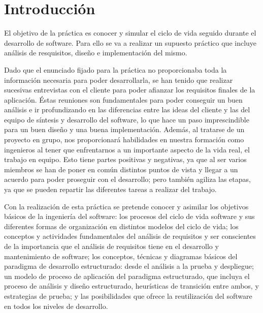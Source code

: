 \documentclass[12pt,a4paper,spanish,twoside]{article}
\begin{document}

\tableofcontents
\newpage
\section{Introducción}
El objetivo de la práctica es conocer y simular el ciclo de vida seguido
durante el desarrollo de software. Para ello se va a realizar un supuesto
práctico que incluye análisis de resquisitos, diseño e implementación del
mismo. 

Dado que el enunciado fijado para la práctica no proporcionaba toda la
información necesaria para poder desarrollarla, se han tenido que realizar
sucesivas entrevistas con el cliente para poder afianzar los requisitos finales
de la aplicación. Éstas reuniones son fundamentales para poder conseguir un
buen análisis e ir profundizando en las diferencias entre las ideas del
cliente y las del equipo de síntesis y desarrollo del software, lo que hace
un paso imprescindible para un buen diseño y una buena
implementación. Además, al tratarse de un proyecto en grupo, nos
proporcionará habilidades en nuestra formación como ingenieros al tener que
enfrentarnos a un importante aspecto de la vida real, el trabajo en
equipo. Esto tiene partes positivas y negativas, ya que al ser varios
miembros se han de poner en común distintos puntos de vista y llegar a un
acuerdo para poder proseguir con el desarrollo; pero también agiliza las
etapas, ya que se pueden repartir las diferentes tareas a realizar del
trabajo. 

Con la realización de esta práctica se pretende conocer y asimilar los
objetivos básicos de la ingeniería del software: los procesos del ciclo de
vida software y sus diferentes formas de organización en distintos modelos
del ciclo de vida; los conceptos y actividades fundamentales del análisis
de requisitos y ser conscientes de la importancia que el análisis de
requisitos tiene en el desarrollo y mantenimiento de software; los conceptos,
técnicas y diagramas básicos del paradigma de desarrollo estructurado: desde
el análisis a la prueba y despliegue; un modelo de proceso de aplicación del
paradigma estructurado, que incluya el proceso de análisis y diseño
estructurado, heurísticas de transición entre ambos, y estrategias de prueba;
y las posibilidades que ofrece la reutilización del software en todos los
niveles de desarrollo. 
\end{document}
